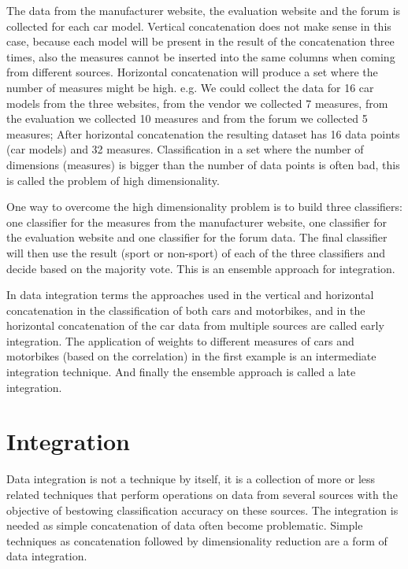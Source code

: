 \documentclass[11pt,a4paper,twoside,openright]{report}
\begin{document}
The data from the manufacturer website, the evaluation website and the forum is
collected for each car model.  Vertical concatenation does not make sense in this
case, because each model will be present in the result of the concatenation
three times, also the measures cannot be inserted into the same columns when
coming from different sources.  Horizontal concatenation will produce a set
where the number of measures might be high.  e.g. We could collect the data for
16 car models from the three websites, from the vendor we collected 7 measures,
from the evaluation we collected 10 measures and from the forum we collected 5
measures;  After horizontal concatenation the resulting dataset has 16 data
points (car models) and 32 measures.  Classification in a set where the number
of dimensions (measures) is bigger than the number of data points is often bad,
this is called the problem of high dimensionality.

One way to overcome the high dimensionality problem is to build three
classifiers:  one classifier for the measures from the manufacturer website,
one classifier for the evaluation website and one classifier for the forum
data.  The final classifier will then use the result (sport or non-sport) of
each of the three classifiers and decide based on the majority vote.  This is
an ensemble approach for integration.

In data integration terms the approaches used in the vertical and horizontal
concatenation in the classification of both cars and motorbikes, and in the
horizontal concatenation of the car data from multiple sources are called early
integration.  The application of weights to different measures of cars and
motorbikes (based on the correlation) in the first example is an intermediate
integration technique.  And finally the ensemble approach is called a late
integration.

\clearpage{\pagestyle{empty}\cleardoublepage}
\chapter{Integration}

Data integration is not a technique by itself, it is a collection of more or
less related techniques that perform operations on data from several sources
with the objective of bestowing classification accuracy on these sources.  The
integration is needed as simple concatenation of data often become problematic.
Simple techniques as concatenation followed by dimensionality reduction are a
form of data integration.
\end{document}
